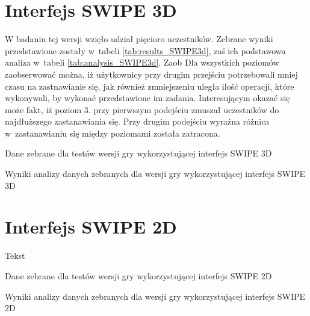 \documentclass[a4paper,12pt,numbers=noenddot]{report}
\begin{document}
\section{Interfejs SWIPE 3D}%
W badaniu tej wersji wzięło udział pięcioro uczestników. Zebrane wyniki przedstawione zostały w~tabeli \ref{tab:results_SWIPE3d}, zaś ich podstawowa analiza w~tabeli \ref{tab:analysis_SWIPE3d}. Zaob
Dla wszystkich poziomów zaobserwować można, iż użytkownicy przy drugim przejściu potrzebowali mniej czasu na zastnawianie się, jak również zmniejszeniu uległa ilość operacji, które wykonywali, by wykonać przedstawione im zadania. 
Interesującym okazać się może fakt, iż poziom 3. przy pierwszym podejściu zmuszał uczestników do najdłuższego zastanawiania się. Przy drugim podejściu wyraźna różnica w~zastanawianiu się między poziomami została zatracona.

\begin{table}

  \caption{Dane zebrane dla testów wersji gry wykorzystującej interfejs SWIPE 3D}
  \resizebox{\textwidth}{!}{%
	
  \end{tabular}%
  }
  \label{tab:results_SWIPE3d}%
  \caption{Wyniki analizy danych zebranych dla wersji gry wykorzystującej interfejs SWIPE 3D}
  \resizebox{\textwidth}{!}{%
	
  \end{tabular}%
  }
  \label{tab:analysis_SWIPE3d}%
\end{table}%


\section{Interfejs SWIPE 2D}%
Tekst
\begin{table}
  \caption{Dane zebrane dla testów wersji gry wykorzystującej interfejs SWIPE 2D}
  \resizebox{0.9\textwidth}{!}{%
	
  }
  \label{tab:results_SWIPE2d}%
  
  
  \caption{Wyniki analizy danych zebranych dla wersji gry wykorzystującej interfejs SWIPE 2D}
  \resizebox{0.9\textwidth}{!}{%
	
  }
  \label{tab:analysis_SWIPE2d}%
\end{table}%
\end{document}
